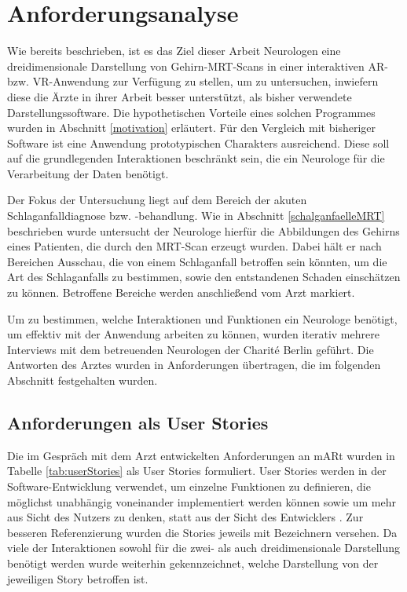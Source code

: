 
\chapter{Anforderungsanalyse}
\label{anforderung}

Wie bereits beschrieben, ist es das Ziel dieser Arbeit Neurologen eine dreidimensionale Darstellung von Gehirn-MRT-Scans in einer interaktiven AR- bzw. VR-Anwendung zur Verfügung zu stellen, um zu untersuchen, inwiefern diese die Ärzte in ihrer Arbeit besser unterstützt, als bisher verwendete Darstellungssoftware. 
 Die hypothetischen Vorteile eines solchen Programmes wurden in Abschnitt \ref{motivation} erläutert.
Für den Vergleich mit bisheriger Software ist eine Anwendung prototypischen Charakters ausreichend. Diese soll auf die grundlegenden Interaktionen beschränkt sein, die ein Neurologe für die Verarbeitung der Daten benötigt.

Der Fokus der Untersuchung liegt auf dem Bereich der akuten Schlaganfalldiagnose bzw. -behandlung. Wie in Abschnitt \ref{schalganfaelleMRT} beschrieben wurde untersucht der Neurologe hierfür die Abbildungen des Gehirns eines Patienten, die durch den MRT-Scan erzeugt wurden. Dabei hält er nach Bereichen Ausschau, die von einem Schlaganfall betroffen sein könnten, um die Art des Schlaganfalls zu bestimmen, sowie den entstandenen Schaden einschätzen zu können. Betroffene Bereiche werden anschließend vom Arzt markiert. 

Um zu bestimmen, welche Interaktionen und Funktionen ein Neurologe benötigt, um effektiv mit der Anwendung arbeiten zu können, wurden iterativ mehrere Interviews mit dem betreuenden Neurologen der Charité Berlin geführt. Die Antworten des Arztes wurden in Anforderungen übertragen, die im folgenden Abschnitt festgehalten wurden. 

\section{Anforderungen als User Stories}

Die im Gespräch mit dem Arzt entwickelten Anforderungen an mARt wurden in Tabelle \ref{tab:userStories} als User Stories formuliert.
User Stories werden in der Software-Entwicklung verwendet, um einzelne Funktionen zu definieren, die möglichst unabhängig voneinander implementiert werden können sowie um mehr aus Sicht des Nutzers zu denken, statt aus der Sicht des Entwicklers \cite{UserStoriesApplied}.
Zur besseren Referenzierung wurden die Stories jeweils mit Bezeichnern versehen. Da viele der Interaktionen sowohl für die zwei- als auch dreidimensionale Darstellung benötigt werden wurde weiterhin gekennzeichnet, welche Darstellung von der jeweiligen Story betroffen ist.

